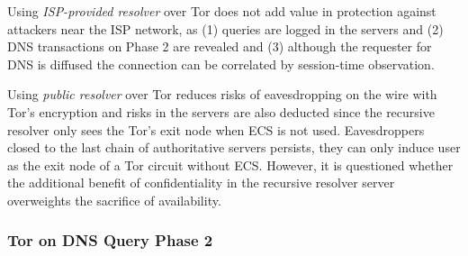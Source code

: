 Using \textit{ISP-provided resolver} over Tor does not add value in protection against attackers near the ISP network, as (1) queries are logged in the servers and (2) DNS transactions on Phase 2 are revealed and (3) although the requester for DNS is diffused the connection can be correlated by session-time observation.

Using \textit{public resolver} over Tor reduces risks of eavesdropping on the wire with Tor's encryption and risks in the servers are also deducted since the recursive resolver only sees the Tor's exit node when ECS is not used.
Eavesdroppers closed to the last chain of authoritative servers persists, they can only induce user as the exit node of a Tor circuit without ECS.
However, it is questioned whether the additional benefit of confidentiality in the recursive resolver server overweights the sacrifice of availability.

\subsubsection{Tor on DNS Query Phase 2}
